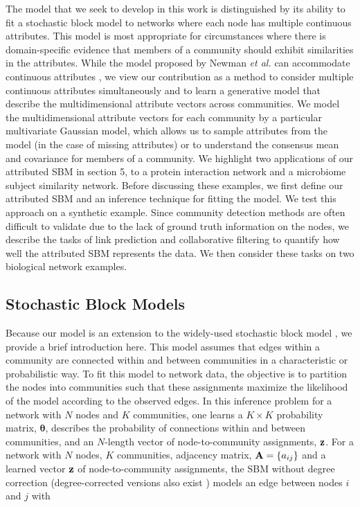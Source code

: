 The model that we seek to develop in this work is distinguished by its ability to fit a stochastic block model to networks where each node has multiple continuous attributes. This model is most appropriate for circumstances where there is domain-specific evidence that members of a community should exhibit similarities in the attributes. While the model proposed by Newman \emph{et al.} can accommodate continuous attributes \cite{clauset}, we view our contribution as a method to consider multiple continuous attributes simultaneously and to learn a generative model that describe the multidimensional attribute vectors across communities. We model the multidimensional attribute vectors for each community by a particular multivariate Gaussian model, which allows us to  sample attributes from the model (in the case of missing attributes) or to understand the consensus mean and covariance for members of a community.  We highlight two applications of our attributed SBM in section 5,  to a protein interaction network and a microbiome subject similarity network. Before discussing these examples, we first define our attributed SBM and an inference technique for fitting the model. We test this approach on a synthetic example. Since community detection methods are often difficult to validate due to the lack of ground truth information on the nodes, we describe the tasks of link prediction and collaborative filtering to quantify how well the attributed SBM represents the data. We then consider these tasks on two biological network examples.

\subsection{Stochastic Block Models}
Because our model is an extension to the widely-used stochastic block model \cite{sbmOrig}, we provide a brief introduction here. This model assumes that edges within a community are connected within and between communities in a characteristic or probabilistic way. To fit this model to network data, the objective is to partition the nodes into communities such that these assignments maximize the likelihood of the model according to the observed edges. In this inference problem for a network with $N$ nodes and $K$ communities, one learns a $K \times K$ probability matrix, ${\boldsymbol \theta}$, describes the probability of connections within and between communities, and an $N$-length vector of node-to-community assignments, ${\bf z}$. For a network with $N$ nodes, $K$ communities, adjacency matrix, ${\bf A}=\{a_{ij}\}$ and a learned vector ${\bf z}$ of node-to-community assignments, the SBM without degree correction (degree-corrected versions also exist \cite{degreeCorrect}) models an edge between nodes $i$ and $j$ with

